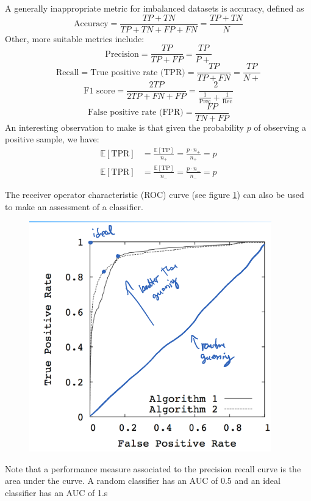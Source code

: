 \documentclass[a4paper,10pt,twoside]{article}
\begin{document}
A generally inappropriate metric for imbalanced datasets is accuracy, defined as 
\begin{equation*}
    \text{Accuracy} = \frac{TP+TN}{TP+TN+FP+FN}=\frac{TP+TN}{N}
\end{equation*}
Other, more suitable metrics include:
\begin{equation*}
    \text{Precision}=\frac{TP}{TP+FP}=\frac{TP}{P+}
\end{equation*}
\begin{equation*}
    \text{Recall}=\text{True positive rate (TPR)}=\frac{TP}{TP+FN}=\frac{TP}{N+}
\end{equation*}
\begin{equation*}
    \text{F1 score}=\frac{2TP}{2TP+FN+FP}=\frac{2}{\frac{1}{\text{Prec}}+\frac{1}{\text{Rec}}}
\end{equation*}
\begin{equation*}
    \text{False positive rate (FPR)} = \frac{FP}{TN+FP}
\end{equation*}
An interesting observation to make is that given the probability $p$ of observing a positive sample, we have:
\begin{align*}
    \mathbb{E}[\text{TPR}]&=\frac{\mathbb{E}[\text{TP}]}{n_+}=\frac{p\cdot n_+}{n_+}=p\\
    \mathbb{E}[\text{TPR}]&=\frac{\mathbb{E}[\text{TP}]}{n_-}=\frac{p\cdot n_-}{n_-}=p
\end{align*}

The receiver operator characteristic (ROC) curve (see figure \ref{roc-curve}) can also be used to make an assessment of a classifier.

\begin{figure}
    \centering
    \includegraphics[width=.5\textwidth]{figures/roc_curve.png}
    \caption{}
    \label{roc-curve}
\end{figure}

Note that a performance measure associated to the precision recall curve is the area under the curve. A random classifier has an AUC of 0.5 and an ideal classifier has an AUC of 1.s
\end{document}
